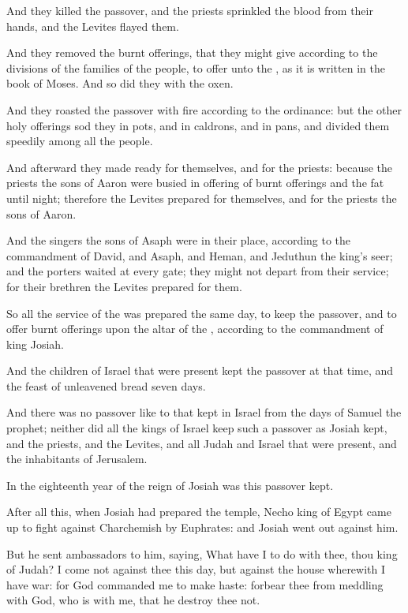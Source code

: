 \verse And they killed the passover, and the priests sprinkled the blood from their hands, and the Levites flayed them.

\verse And they removed the burnt offerings, that they might give according to the divisions of the families of the people, to offer unto the \LORD, as it is written in the book of Moses. And so did they with the oxen.

\verse And they roasted the passover with fire according to the ordinance: but the other holy offerings sod they in pots, and in caldrons, and in pans, and divided them speedily among all the people.

\verse And afterward they made ready for themselves, and for the priests: because the priests the sons of Aaron were busied in offering of burnt offerings and the fat until night; therefore the Levites prepared for themselves, and for the priests the sons of Aaron.

\verse And the singers the sons of Asaph were in their place, according to the commandment of David, and Asaph, and Heman, and Jeduthun the king's seer; and the porters waited at every gate; they might not depart from their service; for their brethren the Levites prepared for them.

\verse So all the service of the \LORD was prepared the same day, to keep the passover, and to offer burnt offerings upon the altar of the \LORD, according to the commandment of king Josiah.

\verse And the children of Israel that were present kept the passover at that time, and the feast of unleavened bread seven days.

\verse And there was no passover like to that kept in Israel from the days of Samuel the prophet; neither did all the kings of Israel keep such a passover as Josiah kept, and the priests, and the Levites, and all Judah and Israel that were present, and the inhabitants of Jerusalem.

\verse In the eighteenth year of the reign of Josiah was this passover kept.

\verse After all this, when Josiah had prepared the temple, Necho king of Egypt came up to fight against Charchemish by Euphrates: and Josiah went out against him.

\verse But he sent ambassadors to him, saying, What have I to do with thee, thou king of Judah? I come not against thee this day, but against the house wherewith I have war: for God commanded me to make haste: forbear thee from meddling with God, who is with me, that he destroy thee not.

